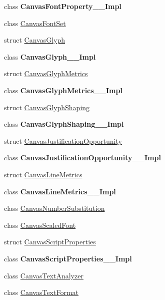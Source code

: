 \begin{DoxyCompactItemize}
\item 
class {\bfseries Canvas\+Font\+Property\+\_\+\+\_\+\+Impl}
\item 
class \hyperlink{class_microsoft_1_1_graphics_1_1_canvas_1_1_text_1_1_canvas_font_set}{Canvas\+Font\+Set}
\item 
struct \hyperlink{struct_microsoft_1_1_graphics_1_1_canvas_1_1_text_1_1_canvas_glyph}{Canvas\+Glyph}
\item 
class {\bfseries Canvas\+Glyph\+\_\+\+\_\+\+Impl}
\item 
struct \hyperlink{struct_microsoft_1_1_graphics_1_1_canvas_1_1_text_1_1_canvas_glyph_metrics}{Canvas\+Glyph\+Metrics}
\item 
class {\bfseries Canvas\+Glyph\+Metrics\+\_\+\+\_\+\+Impl}
\item 
struct \hyperlink{struct_microsoft_1_1_graphics_1_1_canvas_1_1_text_1_1_canvas_glyph_shaping}{Canvas\+Glyph\+Shaping}
\item 
class {\bfseries Canvas\+Glyph\+Shaping\+\_\+\+\_\+\+Impl}
\item 
struct \hyperlink{struct_microsoft_1_1_graphics_1_1_canvas_1_1_text_1_1_canvas_justification_opportunity}{Canvas\+Justification\+Opportunity}
\item 
class {\bfseries Canvas\+Justification\+Opportunity\+\_\+\+\_\+\+Impl}
\item 
struct \hyperlink{struct_microsoft_1_1_graphics_1_1_canvas_1_1_text_1_1_canvas_line_metrics}{Canvas\+Line\+Metrics}
\item 
class {\bfseries Canvas\+Line\+Metrics\+\_\+\+\_\+\+Impl}
\item 
class \hyperlink{class_microsoft_1_1_graphics_1_1_canvas_1_1_text_1_1_canvas_number_substitution}{Canvas\+Number\+Substitution}
\item 
class \hyperlink{class_microsoft_1_1_graphics_1_1_canvas_1_1_text_1_1_canvas_scaled_font}{Canvas\+Scaled\+Font}
\item 
struct \hyperlink{struct_microsoft_1_1_graphics_1_1_canvas_1_1_text_1_1_canvas_script_properties}{Canvas\+Script\+Properties}
\item 
class {\bfseries Canvas\+Script\+Properties\+\_\+\+\_\+\+Impl}
\item 
class \hyperlink{class_microsoft_1_1_graphics_1_1_canvas_1_1_text_1_1_canvas_text_analyzer}{Canvas\+Text\+Analyzer}
\item 
class \hyperlink{class_microsoft_1_1_graphics_1_1_canvas_1_1_text_1_1_canvas_text_format}{Canvas\+Text\+Format}
\item 

\end{DoxyCompactItemize}
